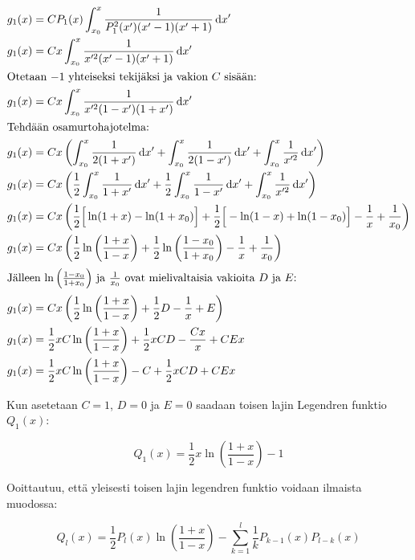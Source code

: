\documentclass[../johdoksia.tex]{subfiles}
\begin{document}
\begin{itemize}
		\begin{align*}
			g_1(x) &= CP_1(x)\int_{x_0}^{x}\frac{1}{P_1^2(x')(x' - 1)(x' + 1)}\odif{x'} \\
			g_1(x) &= Cx\int_{x_0}^{x}\frac{1}{x'^2(x' - 1)(x' + 1)}\odif{x'} \\
			\intertext{Otetaan $-1$ yhteiseksi tekijäksi ja vakion $C$ sisään:}
			g_1(x) &= Cx\int_{x_0}^{x}\frac{1}{x'^2(1 - x')(1 + x')}\odif{x'} \\
			\intertext{Tehdään osamurtohajotelma:}
			g_1(x) &= Cx\left(\int_{x_0}^{x}\frac{1}{2(1 + x')}\odif{x'} + \int_{x_0}^{x}\frac{1}{2(1 - x')}\odif{x'} + \int_{x_0}^{x}\frac{1}{x'^2}\odif{x'}\right) \\
			g_1(x) &= Cx\left(\frac{1}{2}\int_{x_0}^{x}\frac{1}{1 + x'}\odif{x'} + \frac{1}{2}\int_{x_0}^{x}\frac{1}{1 - x'}\odif{x'} + \int_{x_0}^{x}\frac{1}{x'^2}\odif{x'}\right) \\
			g_1(x) &= Cx\left(\frac{1}{2}\Big[\ln(1 + x) - \ln(1 + x_0)\Big] + \frac{1}{2}\Big[-\ln(1 - x) + \ln(1 - x_0)\Big] - \frac{1}{x} + \frac{1}{x_0}\right) \\
			g_1(x) &= Cx\left(\frac{1}{2}\ln\left(\frac{1 + x}{1 - x}\right) + \frac{1}{2}\ln\left(\frac{1 - x_0}{1 + x_0}\right) - \frac{1}{x} + \frac{1}{x_0}\right) \\
			\intertext{Jälleen $\ln\left(\frac{1 - x_0}{1 + x_0}\right)$ ja $\frac{1}{x_0}$ ovat mielivaltaisia vakioita $D$ ja $E$:}
			g_1(x) &= Cx\left(\frac{1}{2}\ln\left(\frac{1 + x}{1 - x}\right) + \frac{1}{2}D - \frac{1}{x} + E\right) \\
			g_1(x) &= \frac{1}{2}xC\ln\left(\frac{1 + x}{1 - x}\right) + \frac{1}{2}xCD - \frac{Cx}{x} + CEx \\
			g_1(x) &= \frac{1}{2}xC\ln\left(\frac{1 + x}{1 - x}\right) - C + \frac{1}{2}xCD + CEx
		\end{align*}
	
		\noindent Kun asetetaan $C = 1$, $D = 0$ ja $E = 0$ saadaan toisen lajin Legendren funktio $Q_1(x)$:
		
		\begin{equation*}
			Q_1(x) = \frac{1}{2}x\ln\left(\frac{1 + x}{1 - x}\right) - 1
		\end{equation*}
	\end{itemize}

	Ooittautuu, että yleisesti toisen lajin legendren funktio voidaan ilmaista muodossa:
	
	\begin{equation}
		\boxed{Q_l(x) = \frac{1}{2}P_l(x)\ln\left(\frac{1 + x}{1 - x}\right) - \sum_{k = 1}^{l}\frac{1}{k}P_{k - 1}(x)P_{l - k}(x)} 
	\end{equation}
\end{document}
